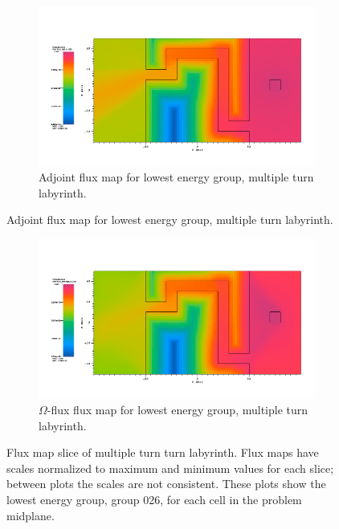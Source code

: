 \begin{figure}[htb!]
  \centering
  \begin{subfigure}[t]{\textwidth}
    \includegraphics[width=0.9\linewidth]{./chapters/characterization_probs/figures/char/maze1/maze1adjG26.png}
    \caption{Adjoint flux map for lowest energy group, multiple turn
    labyrinth.}
    \label{fig:maze1adj}
  \end{subfigure}
\end{figure}
\begin{figure}[htb!]\ContinuedFloat
  \centering
  \begin{subfigure}[t]{\textwidth}
    \includegraphics[width=0.9\linewidth]{./chapters/characterization_probs/figures/char/maze1/maze1omegaG26.png}
    \caption{$\Omega$-flux flux map for lowest energy group, multiple turn
    labyrinth.}
    \label{fig:maze1omega}
  \end{subfigure}
  \caption[Flux map slice of multiple turn labyrinth.]{Flux map slice of
    multiple turn
  turn labyrinth. Flux maps have scales normalized to maximum and minimum values
  for each slice; between plots the scales are not consistent. These plots show
  the lowest energy group, group 026, for each cell in the problem midplane.}
  \label{fig:maze1fluxmaps}
\end{figure}

